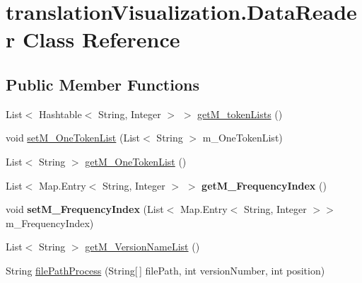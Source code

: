 \hypertarget{classtranslation_visualization_1_1_data_reader}{}\section{translation\+Visualization.\+Data\+Reader Class Reference}
\label{classtranslation_visualization_1_1_data_reader}
\subsection*{Public Member Functions}
\begin{DoxyCompactItemize}
\item 
List$<$ Hashtable$<$ String, Integer $>$ $>$ \hyperlink{classtranslation_visualization_1_1_data_reader_a9f7d0eb449890ad6fcf871f79f7a614c}{get\+M\+\_\+token\+Lists} ()
\item 
void \hyperlink{classtranslation_visualization_1_1_data_reader_a6ae3b7c60cbbad3269bc35c03e25b65d}{set\+M\+\_\+\+One\+Token\+List} (List$<$ String $>$ m\+\_\+\+One\+Token\+List)
\item 
List$<$ String $>$ \hyperlink{classtranslation_visualization_1_1_data_reader_a4f289a631f261a4c1f2cc1ba67fa755a}{get\+M\+\_\+\+One\+Token\+List} ()
\item 
\mbox{\label{classtranslation_visualization_1_1_data_reader_afbf6285cc3386ca40da206de79639610}} 
List$<$ Map.\+Entry$<$ String, Integer $>$ $>$ {\bfseries get\+M\+\_\+\+Frequency\+Index} ()
\item 
\mbox{\label{classtranslation_visualization_1_1_data_reader_ab55bcf952d5471424844eb0821269247}} 
void {\bfseries set\+M\+\_\+\+Frequency\+Index} (List$<$ Map.\+Entry$<$ String, Integer $>$$>$ m\+\_\+\+Frequency\+Index)
\item 
List$<$ String $>$ \hyperlink{classtranslation_visualization_1_1_data_reader_ad0a0ac646cdac28b433749fcea05f4a0}{get\+M\+\_\+\+Version\+Name\+List} ()
\item 
String \hyperlink{classtranslation_visualization_1_1_data_reader_ad2803d802112687247d767d3a229ddb4}{file\+Path\+Process} (String\mbox{[}$\,$\mbox{]} file\+Path, int version\+Number, int position)
\item 
\mbox{\label{classtranslation_visualization_1_1_data_reader_aff02553b4c6b703718c338663231dcda}} 
$$
\end{DoxyCompactItemize}
